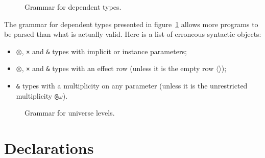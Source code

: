 \begin{figure}[H]
	\centering


	\caption{Grammar for dependent types.}
	\label{fig:zilch-grammar-types-dependent-grammar}
\end{figure}

\begin{warningbox}
	The grammar for dependent types presented in figure~\ref{fig:zilch-grammar-types-dependent-grammar} allows more programs to be parsed than what is actually valid.
	Here is a list of erroneous syntactic objects:
	\begin{itemize}
		\item \texttt{$\otimes$}, \texttt{×} and \texttt{\&} types with implicit or instance parameters;
		\item \texttt{$\otimes$}, \texttt{×} and \texttt{\&} types with an effect row (unless it is the empty row \texttt{$\langle\rangle$});
		\item \texttt{\&} types with a multiplicity on any parameter (unless it is the unrestricted multiplicity \texttt{@$\omega$}).
	\end{itemize}
\end{warningbox}

\begin{figure}[H]
	\centering


	\caption{Grammar for universe levels.}
	\label{fig:zilch-grammar-types-level-grammar}
\end{figure}

\section{Declarations}\label{sec:zilch-grammar-declarations}

